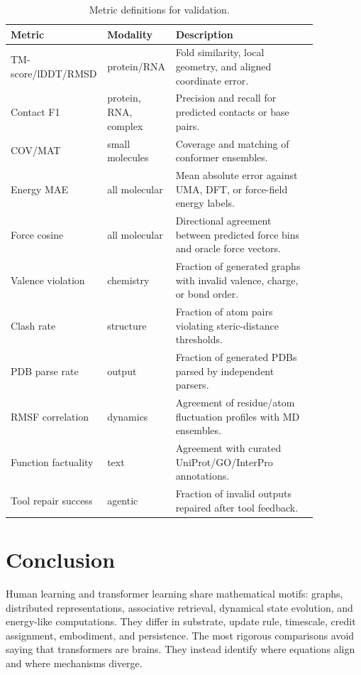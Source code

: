 \documentclass[11pt]{article}
\newcommand{\1}{\mathbf{1}}
\begin{document}
{\scriptsize
\setlength{\tabcolsep}{3pt}
\begin{longtable}{p{0.22\linewidth}p{0.18\linewidth}p{0.46\linewidth}}
\caption{Metric definitions for validation.}\\
\toprule
Metric & Modality & Description \\
\midrule
\endhead
TM-score/lDDT/RMSD & protein/RNA & Fold similarity, local geometry, and aligned coordinate error. \\
Contact F1 & protein, RNA, complex & Precision and recall for predicted contacts or base pairs. \\
COV/MAT & small molecules & Coverage and matching of conformer ensembles. \\
Energy MAE & all molecular & Mean absolute error against UMA, DFT, or force-field energy labels. \\
Force cosine & all molecular & Directional agreement between predicted force bins and oracle force vectors. \\
Valence violation & chemistry & Fraction of generated graphs with invalid valence, charge, or bond order. \\
Clash rate & structure & Fraction of atom pairs violating steric-distance thresholds. \\
PDB parse rate & output & Fraction of generated PDBs parsed by independent parsers. \\
RMSF correlation & dynamics & Agreement of residue/atom fluctuation profiles with MD ensembles. \\
Function factuality & text & Agreement with curated UniProt/GO/InterPro annotations. \\
Tool repair success & agentic & Fraction of invalid outputs repaired after tool feedback. \\
\bottomrule
\end{longtable}}
\section{Conclusion}

Human learning and transformer learning share mathematical motifs: graphs, distributed representations, associative retrieval, dynamical state evolution, and energy-like computations. They differ in substrate, update rule, timescale, credit assignment, embodiment, and persistence. The most rigorous comparisons avoid saying that transformers are brains. They instead identify where equations align and where mechanisms diverge.
\end{document}
